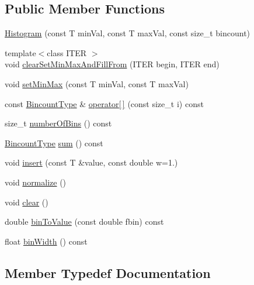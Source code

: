 \subsection*{Public Member Functions}
\begin{DoxyCompactItemize}
\item 
\hyperlink{classnifty_1_1histogram_1_1Histogram_a66ae2c8827268b369f932ac2b8abfd37}{Histogram} (const T min\+Val, const T max\+Val, const size\+\_\+t bincount)
\item 
{\footnotesize template$<$class I\+T\+E\+R $>$ }\\void \hyperlink{classnifty_1_1histogram_1_1Histogram_a6dc9984784d563f8201c95a2c95bbc45}{clear\+Set\+Min\+Max\+And\+Fill\+From} (I\+T\+E\+R begin, I\+T\+E\+R end)
\item 
void \hyperlink{classnifty_1_1histogram_1_1Histogram_ac4790791017587f3ec614c00abd6c68f}{set\+Min\+Max} (const T min\+Val, const T max\+Val)
\item 
const \hyperlink{classnifty_1_1histogram_1_1Histogram_a19ad5e06bce1f70819a7ac9cdb708cf3}{Bincount\+Type} \& \hyperlink{classnifty_1_1histogram_1_1Histogram_a68470922ab80a3e2f7250a544bc148dc}{operator\mbox{[}$\,$\mbox{]}} (const size\+\_\+t i) const 
\item 
size\+\_\+t \hyperlink{classnifty_1_1histogram_1_1Histogram_aaef02f76aa244f4aab008ce6f28f351f}{number\+Of\+Bins} () const 
\item 
\hyperlink{classnifty_1_1histogram_1_1Histogram_a19ad5e06bce1f70819a7ac9cdb708cf3}{Bincount\+Type} \hyperlink{classnifty_1_1histogram_1_1Histogram_a3626b040c3fc0e7de787ac762040e182}{sum} () const 
\item 
void \hyperlink{classnifty_1_1histogram_1_1Histogram_a4b344ea118713a965a4a3e6f3936cb20}{insert} (const T \&value, const double w=1.)
\item 
void \hyperlink{classnifty_1_1histogram_1_1Histogram_a5a4e9b1acdfe1f9feee59e2d8c2abac8}{normalize} ()
\item 
void \hyperlink{classnifty_1_1histogram_1_1Histogram_a6b8a4dfdc710c8c56b3afebe3990dd33}{clear} ()
\item 
double \hyperlink{classnifty_1_1histogram_1_1Histogram_a66445ecaa58cfcc3ecfd6073c252924b}{bin\+To\+Value} (const double fbin) const 
\item 
float \hyperlink{classnifty_1_1histogram_1_1Histogram_a44378e19a3ee17afa45b650e81c42c2e}{bin\+Width} () const 
\end{DoxyCompactItemize}


\subsection{Member Typedef Documentation}
\hypertarget{classnifty_1_1histogram_1_1Histogram_a19ad5e06bce1f70819a7ac9cdb708cf3}{}

